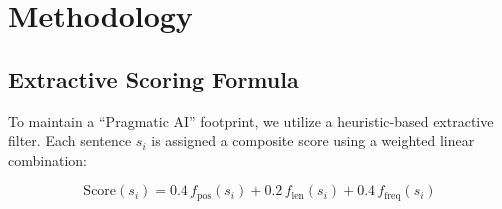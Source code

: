 \documentclass[conference]{IEEEtran}
\begin{document}

\section{Methodology}

\subsection{Extractive Scoring Formula}

To maintain a ``Pragmatic AI'' footprint\cite{8}, we utilize a heuristic-based extractive filter. Each sentence $s_i$ is assigned a composite score using a weighted linear combination\cite{8, 9}:

\begin{equation}
\text{Score}(s_i) = 
0.4\,f_{\text{pos}}(s_i) + 
0.2\,f_{\text{len}}(s_i) + 
0.4\,f_{\text{freq}}(s_i)
\label{eq:scoring}
\end{equation}
\end{document}
